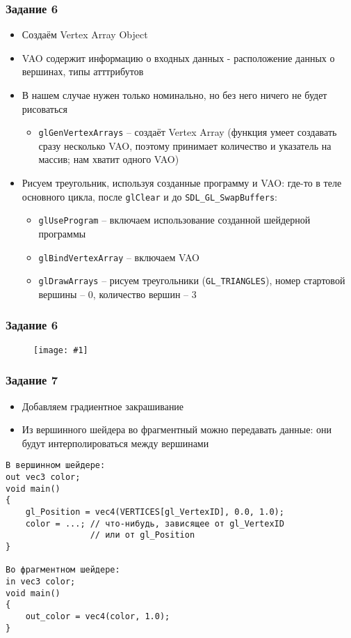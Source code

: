 \documentclass{beamer}
\newcommand{\slideimage}[1]{
  \begin{figure}
    \begin{adjustbox}{width=\textwidth, totalheight=\textheight-2\baselineskip-2\baselineskip,keepaspectratio}
      \texttt{[image: \#1]}
    \end{adjustbox}
  \end{figure}
}
\begin{document}
\begin{frame}[fragile]
\frametitle{Задание 6}
\begin{itemize}
\item Создаём Vertex Array Object
\item VAO содержит информацию о входных данных - расположение данных о вершинах, типы атттрибутов
\item В нашем случае нужен только номинально, но без него ничего не будет рисоваться
\begin{itemize}
\item \verb|glGenVertexArrays| -- создаёт Vertex Array (функция умеет создавать сразу несколько VAO, поэтому принимает количество и указатель на массив; нам хватит одного VAO)
\end{itemize}
\item Рисуем треугольник, используя созданные программу и VAO: где-то в теле основного цикла, после \verb|glClear| и до \verb|SDL_GL_SwapBuffers|:
\begin{itemize}
\item \verb|glUseProgram| -- включаем использование созданной шейдерной программы
\item \verb|glBindVertexArray| -- включаем VAO
\item \verb|glDrawArrays| -- рисуем треугольники (\verb|GL_TRIANGLES|), номер стартовой вершины -- 0, количество вершин -- 3
\end{itemize}
\end{itemize}
\end{frame}

\begin{frame}[fragile]
\frametitle{Задание 6}
\slideimage{task_6.png}
\end{frame}

\begin{frame}[fragile]
\frametitle{Задание 7}
\fontsize{8pt}{8pt}\selectfont
\begin{itemize}
\item Добавляем градиентное закрашивание
\item Из вершинного шейдера во фрагментный можно передавать данные: они будут интерполироваться между вершинами
\end{itemize}
\begin{verbatim}
В вершинном шейдере:
out vec3 color;
void main()
{
    gl_Position = vec4(VERTICES[gl_VertexID], 0.0, 1.0);
    color = ...; // что-нибудь, зависящее от gl_VertexID 
                 // или от gl_Position
}

Во фрагментном шейдере:
in vec3 color;
void main()
{
    out_color = vec4(color, 1.0);
}
\end{verbatim}
\end{frame}
\end{document}
